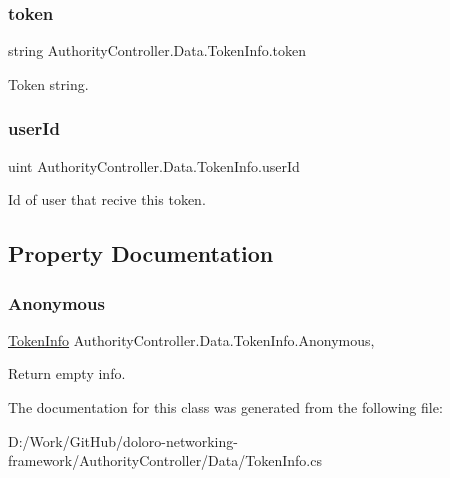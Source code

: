 \subsubsection{\texorpdfstring{token}{token}}
{\footnotesize\ttfamily string Authority\+Controller.\+Data.\+Token\+Info.\+token}



Token string. 

\mbox{\label{class_authority_controller_1_1_data_1_1_token_info_add082450b392251105bbed4327a7de4d}} 
\subsubsection{\texorpdfstring{user\+Id}{userId}}
{\footnotesize\ttfamily uint Authority\+Controller.\+Data.\+Token\+Info.\+user\+Id}



Id of user that recive this token. 



\subsection{Property Documentation}
\mbox{\label{class_authority_controller_1_1_data_1_1_token_info_a9196edb674ec1b14ec98c8c86f4bbcda}} 
\subsubsection{\texorpdfstring{Anonymous}{Anonymous}}
{\footnotesize\ttfamily \mbox{\hyperlink{class_authority_controller_1_1_data_1_1_token_info}{Token\+Info}} Authority\+Controller.\+Data.\+Token\+Info.\+Anonymous\hspace{0.3cm}{\ttfamily [static]}, {\ttfamily [get]}}



Return empty info. 



The documentation for this class was generated from the following file\+:\begin{DoxyCompactItemize}
\item 
D\+:/\+Work/\+Git\+Hub/doloro-\/networking-\/framework/\+Authority\+Controller/\+Data/Token\+Info.\+cs\end{DoxyCompactItemize}
